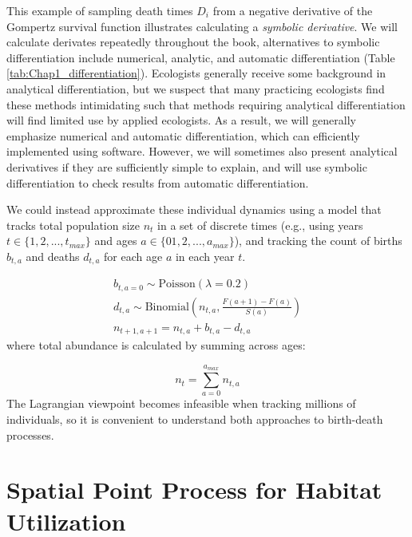 This example of sampling death times \(D_i\) from a negative derivative of the Gompertz survival function illustrates calculating a \textit{symbolic derivative}.  We will calculate derivates repeatedly throughout the book, alternatives to symbolic differentiation include numerical, analytic, and automatic differentiation (Table \ref{tab:Chap1_differentiation}).  Ecologists generally receive some background in analytical differentiation, but we suspect that many practicing ecologists find these methods intimidating such that methods requiring analytical differentiation will find limited use by applied ecologists.  As a result, we will generally emphasize numerical and automatic differentiation, which can efficiently implemented using software.  However, we will sometimes also present analytical derivatives if they are sufficiently simple to explain, and will use symbolic differentiation to check results from automatic differentiation.

We could instead approximate these individual dynamics using a model that tracks total population size \(n_t\) in a set of discrete times (e.g., using years \( t \in \{ 1,2,...,t_{max} \}\) and ages \( a \in \{01,2,..., a_{max}\}\)), and tracking the count of births \(b_{t,a}\) and deaths \(d_{t,a}\) for each age \(a\) in each year \(t\).   

\begin{equation}
\begin{gathered}
    b_{t,a=0} \sim \mathrm{Poisson}(\lambda = 0.2) \\
    d_{t,a} \sim \mathrm{Binomial}\left( n_{t,a}, \frac{F(a+1)-F(a)}{S(a)} \right) \\
    n_{t+1,a+1} = n_{t,a} + b_{t,a} - d_{t,a}
\end{gathered}
\end{equation}
where total abundance is calculated by summing across ages:

\begin{equation}
    n_t = \sum_{a=0}^{a_{max}} n_{t,a}    
\end{equation}
The Lagrangian viewpoint becomes infeasible when tracking millions of individuals, so it is convenient to understand both approaches to birth-death processes.

\section{Spatial Point Process for Habitat Utilization} \label{sec:Chap1_point_process}

